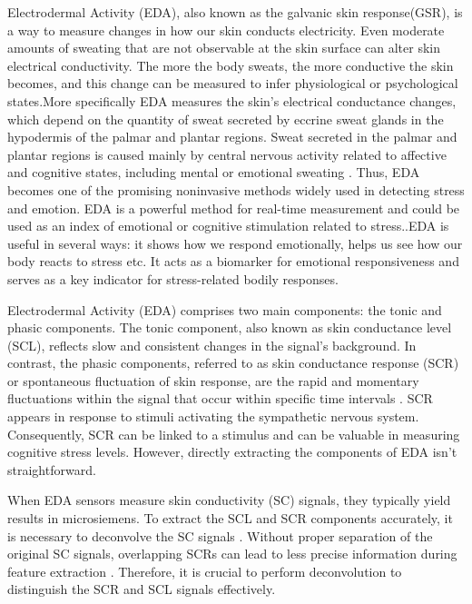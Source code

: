 Electrodermal Activity (EDA), also known as the galvanic skin response(GSR), is a way to measure changes in how our skin conducts electricity. Even moderate amounts of sweating that are not observable at the skin surface can alter skin electrical conductivity. The more the body sweats, the more conductive the skin becomes, and this change can be measured to infer physiological or psychological states.More specifically  EDA measures the skin's electrical conductance changes, which depend on the quantity of sweat secreted by eccrine sweat glands in the hypodermis of the palmar and plantar regions. Sweat secreted in the palmar and plantar regions is caused mainly by central nervous activity related to affective and cognitive states, including mental or emotional sweating \parencite{eda23}. Thus, EDA becomes one of the promising noninvasive methods widely used in detecting stress and emotion. EDA is a powerful method for real-time measurement and could be used as an index of emotional or cognitive stimulation related to stress.\parencite{gellman2020behavioral}.EDA is useful in several ways: it shows how we respond emotionally, helps us see how our body reacts to stress etc. It acts as a biomarker for emotional responsiveness and serves as a key indicator for stress-related bodily responses. 

Electrodermal Activity (EDA) comprises two main components: the tonic and phasic components. The tonic component, also known as skin conductance level (SCL), reflects slow and consistent changes in the signal's background. In contrast, the phasic components, referred to as skin conductance response (SCR) or spontaneous fluctuation of skin response, are the rapid and momentary fluctuations within the signal that occur within specific time intervals \parencite*{hernando2017feature}. SCR appears in response to stimuli activating the sympathetic nervous system. Consequently, SCR can be linked to a stimulus and can be valuable in measuring cognitive stress levels. However, directly extracting the components of EDA isn't straightforward.

When EDA sensors measure skin conductivity (SC) signals, they typically yield results in microsiemens. To extract the SCL and SCR components accurately, it is necessary to deconvolve the SC signals \parencite[postnote]{alexander2005separating}. Without proper separation of the original SC signals, overlapping SCRs can lead to less precise information during feature extraction . Therefore, it is crucial to perform deconvolution to distinguish the SCR and SCL signals effectively.

